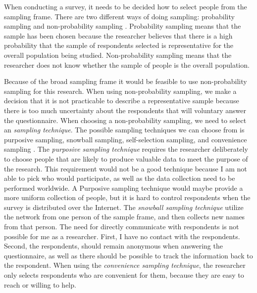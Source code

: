     When conducting a survey, it needs to be decided how to select people from the sampling frame. There are two different ways of doing sampling: probability sampling and non-probability sampling \cite{empiriske}. Probability sampling means that the sample has been chosen because the researcher believes that there is a high probability that the sample of respondents selected is representative for the overall population being studied. Non-probability sampling means that the researcher does not know whether the sample of people is the overall population.

    Because of the broad sampling frame it would be feasible to use non-probability sampling for this research. When using non-probability sampling, we make a decision that it is not practicable to describe a representative sample because there is too much uncertainty about the respondents that will voluntary answer the questionnaire. When choosing a non-probability sampling, we need to select an {\it sampling technique}. The possible sampling techniques we can choose from is purposive sampling, snowball sampling, self-selection sampling, and convenience sampling \cite{empiriske}. The {\it purposive sampling technique} requires the researcher deliberately to choose people that are likely to produce valuable data to meet the purpose of the research. This requirement would not be a good technique because I am not able to pick who would participate, as well as the data collection need to be performed worldwide. A Purposive sampling technique would maybe provide a more uniform collection of people, but it is hard to control respondents when the survey is distributed over the Internet.
    The {\it snowball sampling technique} utilize the network from one person of the sample frame, and then collects new names from that person. The need for directly communicate with respondents is not possible for me as a researcher. {First}, I have no contact with the respondents. {Second}, the respondents, should remain anonymous when answering the questionnaire, as well as there should be possible to track the information back to the respondent. When using the {\it convenience sampling technique}, the researcher only selects respondents who are convenient for them, because they are easy to reach or willing to help.

